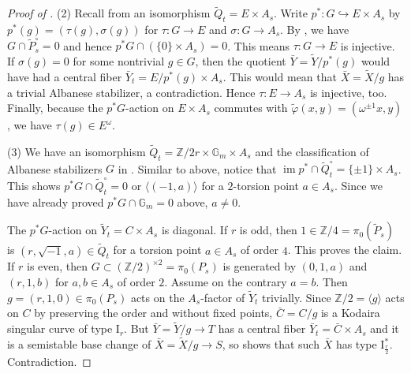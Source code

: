 \documentclass[reqno, letterpaper]{amsart}
\numberwithin{equation}{subsection}
\let\to\longrightarrow
\newcommand{\GG}{\mathbb{G}}
\newcommand{\ZZ}{\mathbb{Z}}
\DeclareMathOperator{\im}{im}
\begin{document}
\begin{proof} [Proof of ]
				(2) Recall from  an isomorphism $\tilde Q_t = E \times A_s$. Write $p^* : G \hookrightarrow E \times A_s$ by $p^*(g) = (\tau(g), \sigma(g))$ for $\tau : G \to E$ and $\sigma : G \to A_s$. By , we have $G \cap \tilde P_s^\circ = 0$ and hence $p^*G \cap (\{ 0 \} \times A_s) = 0$. This means $\tau : G \to E$ is injective. If $\sigma(g) = 0$ for some nontrivial $g \in G$, then the quotient $\bar Y = \tilde Y/p^*(g)$ would have had a central fiber $\bar Y_t = E/p^*(g) \times A_s$. This would mean that $\bar X = \tilde X/g$ has a trivial Albanese stabilizer, a contradiction. Hence $\tau : E \to A_s$ is injective, too. Finally, because the $p^*G$-action on $E \times A_s$ commutes with $\tilde \varphi(x,y) = (\omega^{\pm1}x,y)$, we have $\tau(g) \in E^\omega$.
				
				\medskip
				
				(3) We have an isomorphism $\tilde Q_t = \ZZ/2r \times \GG_m \times A_s$ and the classification of Albanese stabilizers $G$ in . Similar to above, notice that $\im p^* \cap \tilde Q_t^\circ = \{ \pm 1 \} \times A_s$. This shows $p^*G \cap \tilde Q_t^\circ = 0$ or $\langle (-1, a) \rangle$ for a $2$-torsion point $a \in A_s$. Since we have already proved $p^*G \cap \GG_m = 0$ above, $a \neq 0$.
				
				\medskip
				
				The $p^*G$-action on $\tilde Y_t = C \times A_s$ is diagonal. If $r$ is odd, then $1 \in \ZZ/4 = \pi_0 (\tilde P_s)$ is $(r, \sqrt{-1}, a) \in \tilde Q_t$ for a torsion point $a \in A_s$ of order $4$. This proves the claim. If $r$ is even, then $G \subset (\ZZ/2)^{\times 2} = \pi_0(P_s)$ is generated by $(0, 1, a)$ and $(r, 1, b)$ for $a, b \in A_s$ of order $2$. Assume on the contrary $a = b$. Then $g = (r, 1, 0) \in \pi_0(P_s)$ acts on the $A_s$-factor of $\tilde Y_t$ trivially. Since $\ZZ/2 = \langle g \rangle$ acts on $C$ by preserving the order and without fixed points, $\bar C = C / g$ is a Kodaira singular curve of type $\mathrm I_r$. But $\bar Y = \tilde Y/g \to T$ has a central fiber $\bar Y_t = \bar C \times A_s$ and it is a semistable base change of $\bar X = \tilde X/g \to S$, so  shows that such $\bar X$ has type $\mathrm I_{\frac{r}{2}}^*$. Contradiction.
			\end{proof}
			
\end{document}
